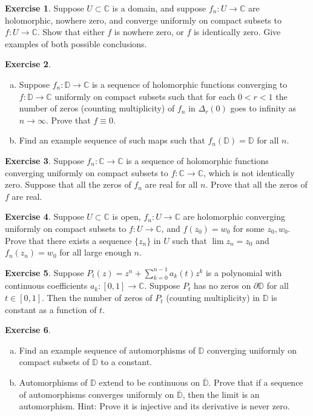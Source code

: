\documentclass[12pt,openany]{book}
\newcommand{\C}{{\mathbb{C}}}
\newcommand{\D}{{\mathbb{D}}}
\theoremstyle{plain}
\theoremstyle{remark}
\theoremstyle{definition}
\newenvironment{exbox}{%
    \def\FrameCommand{\vrule width 1pt \relax\hspace{10pt}}%
    \MakeFramed{\advance\hsize-\width\FrameRestore}%
}{%
    \endMakeFramed
}
\newenvironment{exparts}{%
    \leavevmode\begin{enumerate}[a),noitemsep,topsep=0pt,parsep=0pt,partopsep=0pt]
}{%
    \end{enumerate}
}
\theoremstyle{exercise}
\newtheorem{exercise}{Exercise}[section]
\theoremstyle{example}
\begin{document}
\begin{exbox}
\begin{exercise}
Suppose $U \subset \C$ is a domain,
and suppose
$f_n \colon U \to \C$ are holomorphic, nowhere zero,
and converge uniformly on compact subsets to $f \colon U \to \C$.
Show that either $f$ is nowhere zero, or $f$ is identically zero.
Give examples of both possible conclusions.
\end{exercise}

\begin{exercise}
\begin{exparts}
\item
Suppose $f_n \colon \D \to \C$ is a sequence of holomorphic functions converging
to $f \colon \D \to \C$ uniformly on compact subsets such that
for each $0 < r < 1$ the number of zeros (counting multiplicity)
of $f_n$ in $\Delta_r(0)$ goes to infinity as $n \to \infty$.
Prove that $f \equiv 0$.
\item
Find an example sequence of such maps such that $f_n(\D) = \D$
for all $n$.
\end{exparts}
\end{exercise}

\begin{exercise}
Suppose 
$f_n \colon \C \to \C$ is a sequence of holomorphic
functions
converging uniformly on compact subsets to $f \colon \C \to \C$,
which is not identically zero.
Suppose that all the zeros of $f_n$ are real for all $n$.
Prove that all the zeros of $f$ are real.
\end{exercise}

\begin{exercise}
Suppose $U \subset \C$ is open,
$f_n \colon U \to \C$ are holomorphic
converging uniformly on compact subsets to $f \colon U \to \C$,
and $f(z_0) = w_0$ for some $z_0, w_0$.  
Prove that there exists a sequence $\{ z_n \}$ in $U$ such that
$\lim z_n = z_0$ and $f_n(z_n) = w_0$ for all large enough $n$.
\end{exercise}

\begin{exercise}
Suppose $P_t(z) = z^n + \sum_{k=0}^{n-1} a_k(t) z^k$ is a polynomial
with continuous coefficients $a_k \colon [0,1] \to \C$.  Suppose $P_t$ has
no zeros on $\partial \D$ for all $t \in [0,1]$.  Then the number of zeros
of $P_t$ (counting multiplicity) in $\D$ is constant as a function of $t$.
\end{exercise}

\begin{exercise}
\begin{exparts}
\item
Find an example sequence of automorphisms of $\D$ converging
uniformly on compact subsets of $\D$ to a constant.
\item
Automorphisms of $\D$ extend to be continuous on
$\overline{\D}$.  Prove that if a sequence
of automorphisms converges uniformly on $\overline{\D}$, then
the limit is an automorphism. Hint: Prove it is injective
and its derivative is never zero.
\end{exparts}
\end{exercise}


\end{exbox}
\end{document}
